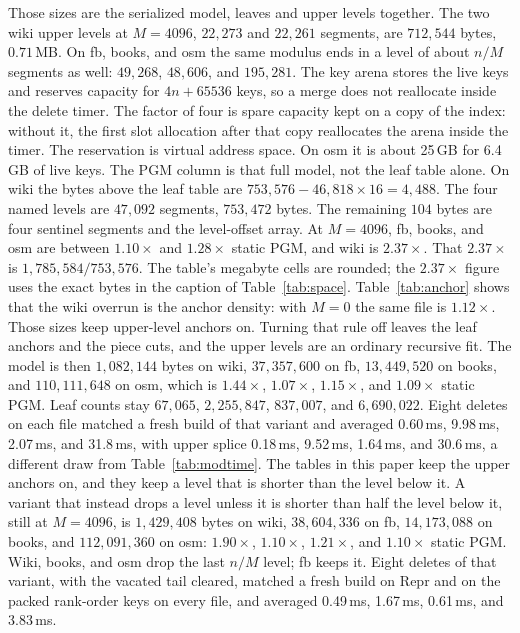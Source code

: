 \documentclass[conference]{IEEEtran}
\begin{document}
Those sizes are the serialized model, leaves and upper levels together.
The two wiki upper levels at $M=4096$, $22{,}273$ and $22{,}261$ segments, are $712{,}544$ bytes, $0.71$\,MB.
On fb, books, and osm the same modulus ends in a level of about $n/M$ segments as well: $49{,}268$, $48{,}606$, and $195{,}281$.
The key arena stores the live keys and reserves capacity for $4n+65536$ keys, so a merge does not reallocate inside the delete timer.
The factor of four is spare capacity kept on a copy of the index: without it, the first slot allocation after that copy reallocates the arena inside the timer.
The reservation is virtual address space.
On osm it is about 25\,GB for 6.4\,GB of live keys.
The PGM column is that full model, not the leaf table alone.
On wiki the bytes above the leaf table are $753{,}576-46{,}818\times 16=4{,}488$.
The four named levels are $47{,}092$ segments, $753{,}472$ bytes.
The remaining $104$ bytes are four sentinel segments and the level-offset array.
At $M=4096$, fb, books, and osm are between $1.10\times$ and $1.28\times$ static PGM, and wiki is $2.37\times$.
That $2.37\times$ is $1{,}785{,}584/753{,}576$.
The table's megabyte cells are rounded; the $2.37\times$ figure uses the exact bytes in the caption of Table~\ref{tab:space}.
Table~\ref{tab:anchor} shows that the wiki overrun is the anchor density: with $M=0$ the same file is $1.12\times$.
Those sizes keep upper-level anchors on.
Turning that rule off leaves the leaf anchors and the piece cuts, and the upper levels are an ordinary recursive fit.
The model is then $1{,}082{,}144$ bytes on wiki, $37{,}357{,}600$ on fb, $13{,}449{,}520$ on books, and $110{,}111{,}648$ on osm, which is $1.44\times$, $1.07\times$, $1.15\times$, and $1.09\times$ static PGM.
Leaf counts stay $67{,}065$, $2{,}255{,}847$, $837{,}007$, and $6{,}690{,}022$.
Eight deletes on each file matched a fresh build of that variant and averaged 0.60\,ms, 9.98\,ms, 2.07\,ms, and 31.8\,ms, with upper splice 0.18\,ms, 9.52\,ms, 1.64\,ms, and 30.6\,ms, a different draw from Table~\ref{tab:modtime}.
The tables in this paper keep the upper anchors on, and they keep a level that is shorter than the level below it.
A variant that instead drops a level unless it is shorter than half the level below it, still at $M=4096$, is $1{,}429{,}408$ bytes on wiki, $38{,}604{,}336$ on fb, $14{,}173{,}088$ on books, and $112{,}091{,}360$ on osm: $1.90\times$, $1.10\times$, $1.21\times$, and $1.10\times$ static PGM.
Wiki, books, and osm drop the last $n/M$ level; fb keeps it.
Eight deletes of that variant, with the vacated tail cleared, matched a fresh build on $\mathrm{Repr}$ and on the packed rank-order keys on every file, and averaged 0.49\,ms, 1.67\,ms, 0.61\,ms, and 3.83\,ms.
\end{document}
